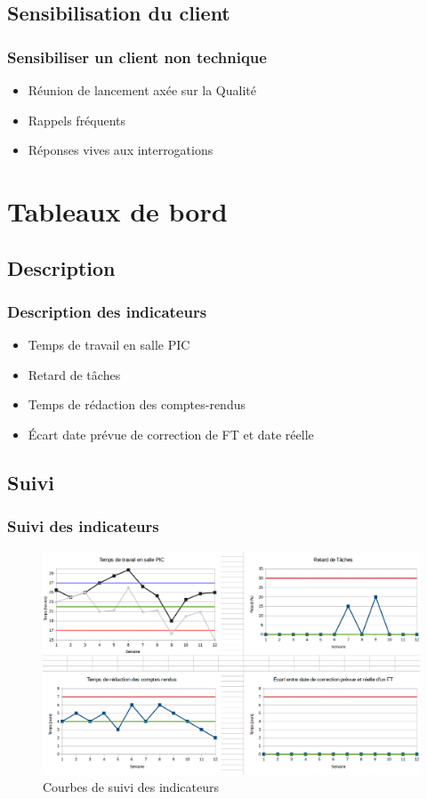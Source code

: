 \documentclass[compress,xcolor=dvipsnames]{beamer}
\begin{document}
\subsection{Sensibilisation du client}
\begin{frame}
\frametitle{Sensibiliser un client non technique}
\begin{itemize}
\item Réunion de lancement axée sur la Qualité
\item Rappels fréquents
\item Réponses vives aux interrogations
\end{itemize}
\end{frame}


\section{Tableaux de bord}

\subsection{Description}
\begin{frame}
\frametitle{Description des indicateurs}
\begin{itemize}
\item Temps de travail en salle PIC
\item Retard de tâches
\item Temps de rédaction des comptes-rendus
\item Écart date prévue de correction de FT et date réelle
\end{itemize}
\end{frame}	

\subsection{Suivi}
\begin{frame}
\frametitle{Suivi des indicateurs}
\begin{center}
			\begin{figure}
				\includegraphics[scale=0.21]{./images/TB2.png}
				\caption{Courbes de suivi des indicateurs}
			\end{figure}
		\end{center}
\end{frame}	
\end{document}
